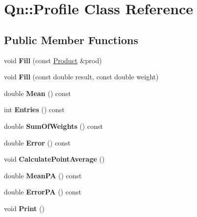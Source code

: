 \hypertarget{classQn_1_1Profile}{}\section{Qn\+:\+:Profile Class Reference}
\label{classQn_1_1Profile}
\subsection*{Public Member Functions}
\begin{DoxyCompactItemize}
\item 
\mbox{\label{classQn_1_1Profile_a923d60063e1146e1ba3efa2780fa6e13}} 
void {\bfseries Fill} (const \mbox{\hyperlink{structQn_1_1Product}{Product}} \&prod)
\item 
\mbox{\label{classQn_1_1Profile_a3f7de0baedd56363aff0371ca2ff7ef3}} 
void {\bfseries Fill} (const double result, const double weight)
\item 
\mbox{\label{classQn_1_1Profile_ae4de768e843b7057ca505afdf399cdc0}} 
double {\bfseries Mean} () const
\item 
\mbox{\label{classQn_1_1Profile_af24377238e442414bb2849687e5badc7}} 
int {\bfseries Entries} () const
\item 
\mbox{\label{classQn_1_1Profile_a605675b9e0382bee6c8d2ba12adf63f5}} 
double {\bfseries Sum\+Of\+Weights} () const
\item 
\mbox{\label{classQn_1_1Profile_a36716bb08d244f28d0696f13dfff6f62}} 
double {\bfseries Error} () const
\item 
\mbox{\label{classQn_1_1Profile_af68184508ef7feb43a36a9db78787ca5}} 
void {\bfseries Calculate\+Point\+Average} ()
\item 
\mbox{\label{classQn_1_1Profile_abfe40e0bd565f4516faf1c437efe2cfb}} 
double {\bfseries Mean\+PA} () const
\item 
\mbox{\label{classQn_1_1Profile_aa3451138ba2a66e1e0977077ddfe53d5}} 
double {\bfseries Error\+PA} () const
\item 
\mbox{\label{classQn_1_1Profile_a6f7e2ef76edf983d61432bf106e221ff}} 
void {\bfseries Print} ()
\end{DoxyCompactItemize}

